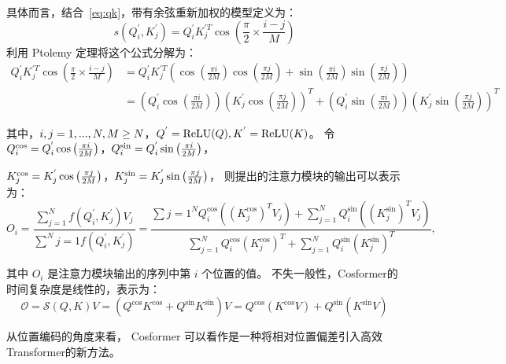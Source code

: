 具体而言，结合~\eqref{eq:qk}，带有余弦重新加权的模型定义为：
\begin{equation}
\textstyle{
s(Q_i^{'}, K_j^{'})
= Q_{i}^{'}K_{j}^{'T}\cos\left(\frac{\pi}{2} \times \frac{i-j}{M} \right)
}
\end{equation}
\cite{zhen2022cosformer}利用 Ptolemy 定理将这个公式分解为：
\scriptsize
\begin{equation}
\begin{aligned}
Q_{i}^{'}K_{j}^{'T}\cos\left(\frac{\pi}{2} \times \frac{i-j}{M} \right) 
&=Q_{i}^{'}K_{j}^{'T}\left(\cos\left(\frac{\pi i}{2M}\right)\cos\left(\frac{\pi j}{2M}\right) + \sin\left(\frac{\pi i}{2M}\right)\sin\left(\frac{\pi j}{2M}\right)\right)\ \\
&= \left(Q_{i}^{'} \cos \left(\frac{\pi i}{2M}\right)\right)\left(K_{j}^{'}\cos\left(\frac{\pi j}{2M}\right)\right)^{T} + \left(Q_{i}^{'}\sin\left(\frac{\pi i}{2M}\right)\right)\left(K_{j}^{'} \sin\left(\frac{\pi j}{2M}\right)\right)^{T}
\end{aligned}
\end{equation}
\normalsize

其中，$\small{i ,j= 1,...,N, M \geq N}$，$\small{Q^{'} = \mathrm{ReLU}(Q),K^{'} = \mathrm{ReLU}(K)}$。
令 $\small{Q_{i}^{\cos} =Q_{i}^{'} \cos \left(\frac{\pi i}{2M}\right)}$，$\small{Q_{i}^{\sin} =Q_{i}^{'} \sin \left(\frac{\pi i}{2M}\right)}$，

$\small{K_j^{\cos} =K_{j}^{'}\cos\left(\frac{\pi j}{2M}\right)}$，$\small{K_j^{\sin} =K_{j}^{'}\sin\left(\frac{\pi j}{2M}\right)}$，
则提出的注意力模块的输出可以表示为：
\begin{equation}
\label{eq appendix}
\textstyle{
O_i = \frac{\sum_{j=1}^N f(Q_i^{'}, K_j^{'}) V_j}{\sum^{N}{j=1} f(Q_i^{'}, K_j^{'}) }
= \frac{\sum{j=1}^N Q_{i}^{\cos} \left( \left( K_j^{\cos} \right)^TV_j \right)+\sum_{j=1}^N Q_{i}^{\sin} \left(\left( K_j^{\sin} \right)^T V_j \right)}{\sum_{j=1}^N Q_{i}^{\cos} \left( K_j^{\cos} \right)^T+\sum_{j=1}^N Q_{i}^{\sin} \left( K_j^{\sin} \right)^T },
}
\end{equation}

其中 $O_i$ 是注意力模块输出的序列中第 $i$ 个位置的值。
不失一般性，Cosformer的时间复杂度是线性的，表示为：
\begin{equation}
\textstyle{
\mathcal{O} = \mathcal{S}(Q, K)V
=(Q^{\cos}K^{\cos} + Q^{\sin}K^{\sin})V
=Q^{\cos}(K^{\cos}V) + Q^{\sin}(K^{\sin}V)
}
\end{equation}

从位置编码的角度来看， Cosformer 可以看作是一种将相对位置偏差引入高效Transformer的新方法。